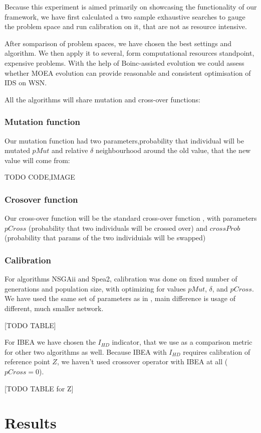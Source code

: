 \documentclass[12pt,oneside]{fithesis2}
\begin{document}
Because this experiment is aimed primarily on showcasing the functionality of our framework, 
we have first calculated a two sample exhaustive searches to gauge the problem space and run calibration on it, that are not as resource intensive.

After somparison of problem spaces, we have chosen the best settings and algorithm. We then apply it to several, form computational resources standpoint, expensive problems. With the help of Boinc-assisted evolution we could assess whether MOEA evolution can provide reasonable and consistent optimisation of IDS on WSN.

All the algorithms will share mutation and cross-over functions:

\subsubsection{Mutation function}
Our mutation function had two parameters,probability that individual will be mutated $pMut$ and relative $\delta$ neighbourhood around the old value, that the new value will come from:

TODO CODE,IMAGE

\subsubsection{Crosover function}
Our cross-over function will be the standard cross-over function , with parameters $pCross$ (probability that two individuals will be crossed over) and $crossProb$ (probability that params of the two individuials will be swapped)

\subsubsection{Calibration}

For algorithms NSGAii and Spea2, calibration was done on fixed number of generations and population size, with optimizing for values $pMut$, $\delta$, and $pCross$. We have used the same set of parameters as in \cite{stehl2013opt}, main difference is usage of different, much smaller network.

[TODO TABLE]

For IBEA we have chosen the $I_{HD}$ indicator, that we use as a comparison metric for other two algorithms as well. Because IBEA with $I_{HD}$ requires calibration of reference point $Z$, we haven't used crossover operator with IBEA at all ($pCross=0$).

[TODO TABLE for Z]

\section{Results}



\end{document}
